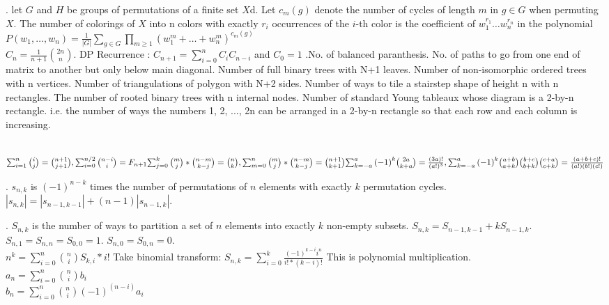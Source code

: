 . let $G$ and $H$ be groups of permutations of a finite set $X$d. Let $c_m(g)$ denote the number of cycles of length $m$ in $g \in G$ when permuting $X$. The number of colorings of $X$ into n colors with exactly $r_i$ occurrences of the $i$-th color is the coefficient of $w_1^{r_1}\ldots w_n^{r_n}$ in the polynomial $P(w_1,\ldots ,w_n)=\frac{1}{\left|G\right|}\sum_{g\in G}\prod_{m\ge 1}(w_1^m+\ldots +w_n^m)^{c_m(g)}$ \\

$C_{n} = \frac{1}{n+1}{{2n}\choose{n}}$. DP Recurrence : $C_{n+1} = \sum_{i=0}^{n}C_{i}C_{n-i}$ and $C_{0}=1$ .No. of balanced paranthesis. No. of paths to go from one end of matrix to another but only below main diagonal. Number of full binary trees with N+1 leaves. Number of non-isomorphic ordered trees with n vertices. Number of triangulations of polygon with N+2 sides. Number of ways to tile a stairstep shape of height n with n rectangles. The number of rooted binary trees with n internal nodes.  Number of standard Young tableaux whose diagram is a 2-by-n rectangle. i.e. the number of ways the numbers 1, 2, ..., 2n can be arranged in a 2-by-n rectangle so that each row and each column is increasing.
 
\\
${\sum_{i=1}^{n} {\binom {i}{j}} = {\binom {n+1}{j+1}}}
,  {\sum_{i=0}^{n/2} {\binom {n-i}{i}} = F_{n+1}}\\
{\sum_{j=0}^{k} {\binom {m}{j}}*{\binom {n-m}{k-j}} = {\binom {n}{k}}}
, {\sum_{m=0}^{n} {\binom {m}{j}}*{\binom {n-m}{k-j}} = {\binom {n+1}{k+1}}}\\
{\sum_{k=-a}^{a} {(-1)}^k {\binom {2a}{k+a}} = \frac{(3a)!}{(a!)^3}},  
{\sum_{k=-a}^{a} {(-1)}^k {\binom {a+b}{a+k}}{\binom {b+c}{b+k}}{\binom {c+a}{c+k}} = \frac{(a+b+c)!}{(a!)(b!)(c!)}}$

.
$s_{n,k}$ is $(-1)^{n-k}$ times the number of permutations of $n$ elements with
exactly $k$ permutation cycles.
$|s_{n,k}| = |s_{n-1,k-1}| + (n-1) |s_{n-1,k}|$.
 
.
$S_{n,k}$ is the number of ways to partition a set of $n$ elements into
exactly $k$ non-empty subsets.
$S_{n,k} = S_{n-1,k-1} + k S_{n-1,k}$.  
$S_{n,1} = S_{n,n} = S_{0,0} = 1$.
$S_{n,0} = S_{0,n} = 0$.\\
$n^{k} = \sum_{i=0}^n \binom{n}{i} S_{k,i} * i!$
Take binomial transform: $S_{n,k} = \sum_{i=0}^{k} {\frac {(-1)^{k-i} i^{n}} {i! * (k-i)!}}$
This is polynomial multiplication.\\
$a_{n} = {\sum_{i=0}^{n}} \binom {n}{i} b_{i}$\\
$b_{n} = {\sum_{i=0}^{n}} \binom {n}{i} (-1)^(n-i) a_{i}$

